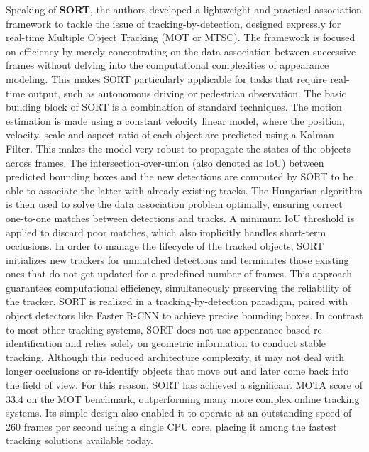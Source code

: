 Speaking of \textbf{SORT}, the authors developed a lightweight and practical association framework to tackle the issue of tracking-by-detection, designed expressly for real-time Multiple Object Tracking (MOT or MTSC). The framework is focused on efficiency by merely concentrating on the data association between successive frames without delving into the computational complexities of appearance modeling. This makes SORT particularly applicable for tasks that require real-time output, such as autonomous driving or pedestrian observation.
The basic building block of SORT is a combination of standard techniques. The motion estimation is made using a constant velocity linear model, where the position, velocity, scale and aspect ratio of each object are predicted using a Kalman Filter. This makes the model very robust to propagate the states of the objects across frames. The intersection-over-union (also denoted as IoU) between predicted bounding boxes and the new detections are computed by SORT to be able to associate the latter with already existing tracks. The Hungarian algorithm is then used to solve the data association problem optimally, ensuring correct one-to-one matches between detections and tracks. A minimum IoU threshold is applied to discard poor matches, which also implicitly handles short-term occlusions. In order to manage the lifecycle of the tracked objects, SORT initializes new trackers for unmatched detections and terminates those existing ones that do not get updated for a predefined number of frames. This approach guarantees computational efficiency, simultaneously preserving the reliability of the tracker.
SORT is realized in a tracking-by-detection paradigm, paired with object detectors like Faster R-CNN to achieve precise bounding boxes. In contrast to most other tracking systems, SORT does not use appearance-based re-identification and relies solely on geometric information to conduct stable tracking. Although this reduced architecture complexity, it may not deal with longer occlusions or re-identify objects that move out and later come back into the field of view.
For this reason, SORT has achieved a significant MOTA score of 33.4 on the MOT benchmark, outperforming many more complex online tracking systems. Its simple design also enabled it to operate at an outstanding speed of 260 frames per second using a single CPU core, placing it among the fastest tracking solutions available today.

